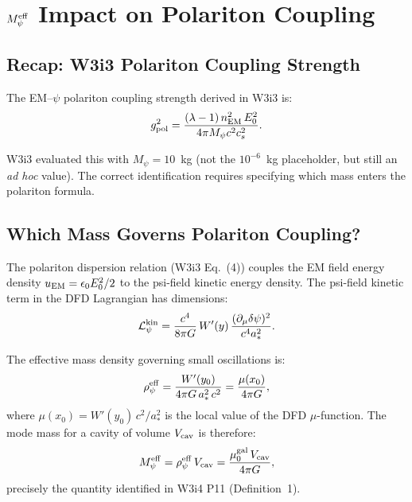 \documentclass[aps,prd,twocolumn,superscriptaddress,nofootinbib]{revtex4-2}
\newcommand{\Meff}{M_\psi^{\rm eff}}
\begin{document}
\section{$\Meff$ Impact on Polariton Coupling}
\label{sec:polariton}

\subsection{Recap: W3i3 Polariton Coupling Strength}

The EM--$\psi$ polariton coupling strength derived in W3i3 is:
\begin{equation}
g_{\rm pol}^2 = \frac{(\lambda-1)\,n_{\rm EM}^2\,E_0^2}
{4\pi M_\psi c^2 c_s^2}.
\label{eq:gpol}
\end{equation}

W3i3 evaluated this with $M_\psi = 10$~kg (not the $10^{-6}$~kg
placeholder, but still an \emph{ad hoc} value). The correct identification
requires specifying which mass enters the polariton formula.

\subsection{Which Mass Governs Polariton Coupling?}

The polariton dispersion relation (W3i3 Eq.~(4)) couples the EM field
energy density $u_{\rm EM} = \epsilon_0 E_0^2/2$ to the psi-field
kinetic energy density. The psi-field kinetic term in the DFD Lagrangian
has dimensions:
\begin{equation}
\mathcal{L}_\psi^{\rm kin} = \frac{c^4}{8\pi G}\,W'(y)\,
\frac{(\partial_\mu\delta\psi)^2}{c^4 a_*^2}.
\end{equation}

The effective mass density governing small oscillations is:
\begin{equation}
\rho_\psi^{\rm eff} = \frac{W'(y_0)}{4\pi G\,a_*^2\,c^2}
= \frac{\mu(x_0)}{4\pi G},
\label{eq:rho_eff}
\end{equation}
where $\mu(x_0) = W'(y_0)\,c^2/a_*^2$ is the local value of the
DFD $\mu$-function. The mode mass for a cavity of volume $V_{\rm cav}$
is therefore:
\begin{equation}
\Meff = \rho_\psi^{\rm eff}\,V_{\rm cav}
= \frac{\mu_0^{\rm gal}\,V_{\rm cav}}{4\pi G},
\label{eq:Meff_def}
\end{equation}
precisely the quantity identified in W3i4 P11 (Definition~1).
\end{document}
